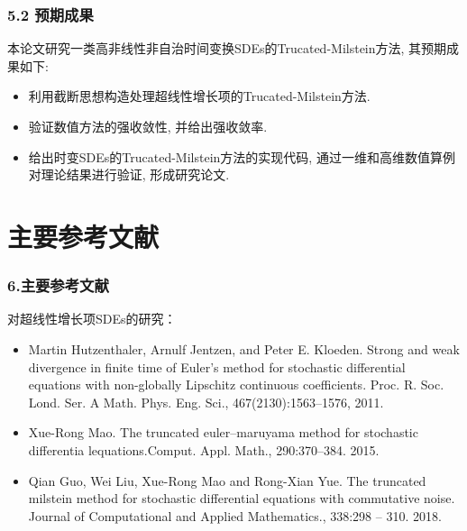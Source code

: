 \documentclass[notheorems,10pt,compress]{beamer}
\numberwithin{figure}{section}
\numberwithin{table}{section}
\numberwithin{equation}{section}
\numberwithin{theorem}{section}
\numberwithin{definition}{section}
\numberwithin{lemma}{section}
\numberwithin{proposition}{section}
\numberwithin{corollary}{section}
\theoremstyle{example}
\begin{document}
\begin{frame}
    \frametitle{ 5.2 预期成果}
    \begin{block}{}
        \hspace{2em}本论文研究一类高非线性非自治时间变换SDEs的Trucated-Milstein方法, 其\alert{预期成果}如下:
        \vskip 6pt
        \begin{itemize}
            \setlength{\itemsep}{6pt}
            \item 利用截断思想构造处理超线性增长项的Trucated-Milstein方法.
            \item 验证数值方法的强收敛性, 并给出强收敛率.
            \item 给出时变SDEs的Trucated-Milstein方法的实现代码, 通过一维和高维数值算例对理论结果进行验证, 形成研究论文.
        \end{itemize}
    \end{block}
\end{frame}

\section{主要参考文献}


\begin{frame}
    \frametitle{6.主要参考文献\\}
    
    
    \textcolor[rgb]{0.00,0.00,1.00}{对超线性增长项SDEs的研究：}
    \begin{itemize}
        
        \item Martin Hutzenthaler, Arnulf Jentzen, and Peter E. Kloeden. Strong and weak divergence in finite time of Euler’s method for stochastic differential equations with non-globally Lipschitz continuous coefficients. Proc. R. Soc. Lond. Ser. A Math. Phys. Eng. Sci., 467(2130):1563–1576, 2011.
        \item Xue-Rong Mao. The truncated euler–maruyama method for stochastic differentia lequations.Comput. Appl. Math.,  290:370–384. 2015.
        \item Qian Guo, Wei Liu, Xue-Rong Mao and  Rong-Xian Yue. The truncated milstein method for stochastic differential equations with commutative noise. Journal of Computational and Applied Mathematics., 338:298 – 310. 2018.
        
        
    \end{itemize}
\end{frame}
\end{document}
